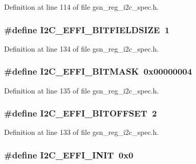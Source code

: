 Definition at line 114 of file gsn\_\-reg\_\-i2c\_\-spec.h.

\hypertarget{a00558_a4fa3075376bc13ec626373017a05135c}{
\subsubsection[{I2C\_\-EFFI\_\-BITFIELDSIZE}]{\setlength{\rightskip}{0pt plus 5cm}\#define I2C\_\-EFFI\_\-BITFIELDSIZE~1}}
\label{a00558_a4fa3075376bc13ec626373017a05135c}


Definition at line 134 of file gsn\_\-reg\_\-i2c\_\-spec.h.

\hypertarget{a00558_ae0d5a25d624ce240e748e8b4c77d2a16}{
\subsubsection[{I2C\_\-EFFI\_\-BITMASK}]{\setlength{\rightskip}{0pt plus 5cm}\#define I2C\_\-EFFI\_\-BITMASK~0x00000004}}
\label{a00558_ae0d5a25d624ce240e748e8b4c77d2a16}


Definition at line 135 of file gsn\_\-reg\_\-i2c\_\-spec.h.

\hypertarget{a00558_ae60a6b235b3e7d91c7787ed281d21d46}{
\subsubsection[{I2C\_\-EFFI\_\-BITOFFSET}]{\setlength{\rightskip}{0pt plus 5cm}\#define I2C\_\-EFFI\_\-BITOFFSET~2}}
\label{a00558_ae60a6b235b3e7d91c7787ed281d21d46}


Definition at line 133 of file gsn\_\-reg\_\-i2c\_\-spec.h.

\hypertarget{a00558_a523d8e245b682ed4619458c9cb382e27}{
\subsubsection[{I2C\_\-EFFI\_\-INIT}]{\setlength{\rightskip}{0pt plus 5cm}\#define I2C\_\-EFFI\_\-INIT~0x0}}
\label{a00558_a523d8e245b682ed4619458c9cb382e27}


